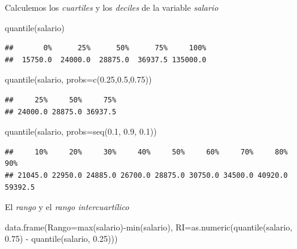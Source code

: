 \documentclass[
]{book}
\newenvironment{Shaded}{\begin{snugshade}}{\end{snugshade}}
\newcommand{\AttributeTok}[1]{\textcolor[rgb]{0.77,0.63,0.00}{#1}}
\newcommand{\FloatTok}[1]{\textcolor[rgb]{0.00,0.00,0.81}{#1}}
\newcommand{\FunctionTok}[1]{\textcolor[rgb]{0.00,0.00,0.00}{#1}}
\newcommand{\NormalTok}[1]{#1}
\newcommand{\SpecialCharTok}[1]{\textcolor[rgb]{0.00,0.00,0.00}{#1}}
\theoremstyle{break}
\theoremstyle{nonumberplain}
\begin{document}
Calculemos los \emph{cuartiles} y los \emph{deciles} de la variable \emph{salario}

\begin{Shaded}
\begin{Highlighting}[]
\FunctionTok{quantile}\NormalTok{(salario)}
\end{Highlighting}
\end{Shaded}

\begin{verbatim}
##       0%      25%      50%      75%     100% 
##  15750.0  24000.0  28875.0  36937.5 135000.0
\end{verbatim}

\begin{Shaded}
\begin{Highlighting}[]
\FunctionTok{quantile}\NormalTok{(salario, }\AttributeTok{probs=}\FunctionTok{c}\NormalTok{(}\FloatTok{0.25}\NormalTok{,}\FloatTok{0.5}\NormalTok{,}\FloatTok{0.75}\NormalTok{))}
\end{Highlighting}
\end{Shaded}

\begin{verbatim}
##     25%     50%     75% 
## 24000.0 28875.0 36937.5
\end{verbatim}

\begin{Shaded}
\begin{Highlighting}[]
\FunctionTok{quantile}\NormalTok{(salario, }\AttributeTok{probs=}\FunctionTok{seq}\NormalTok{(}\FloatTok{0.1}\NormalTok{, }\FloatTok{0.9}\NormalTok{, }\FloatTok{0.1}\NormalTok{))}
\end{Highlighting}
\end{Shaded}

\begin{verbatim}
##     10%     20%     30%     40%     50%     60%     70%     80%     90% 
## 21045.0 22950.0 24885.0 26700.0 28875.0 30750.0 34500.0 40920.0 59392.5
\end{verbatim}

El \emph{rango} y el \emph{rango intercuartílico}

\begin{Shaded}
\begin{Highlighting}[]
\FunctionTok{data.frame}\NormalTok{(}\AttributeTok{Rango=}\FunctionTok{max}\NormalTok{(salario)}\SpecialCharTok{{-}}\FunctionTok{min}\NormalTok{(salario),}
           \AttributeTok{RI=}\FunctionTok{as.numeric}\NormalTok{(}\FunctionTok{quantile}\NormalTok{(salario, }\FloatTok{0.75}\NormalTok{) }\SpecialCharTok{{-}} \FunctionTok{quantile}\NormalTok{(salario, }\FloatTok{0.25}\NormalTok{)))}
\end{Highlighting}
\end{Shaded}
\end{document}
